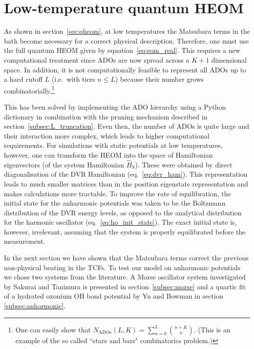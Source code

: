 \section{Low-temperature quantum HEOM}\label{sec:qheom_low_temp}
As shown in section~\ref{sec:qheom}, at low temperatures the Matsubara terms in the bath become necessary for a correct physical description. Therefore, one must use the full quantum HEOM given by equation~\ref{eq:eom_real}. This requires a new computational treatment since ADOs are now spread across a $K+1$ dimensional space. In addition, it is not computationally feasible to represent all ADOs up to a hard cutoff $L$ (i.e.~with tiers $n\le L$) because their number grows combinatorially.\footnote[2]{One can easily show that $N_\mathrm{ADOs}(L,K) = \sum_{n=0}^{L}\binom{n+K}{n}$. (This is an example of the so called ``stars and bars" combinatorics problem.)}

This has been solved by implementing the ADO hierarchy using a Python dictionary in combination with the pruning mechanism described in section~\ref{subsec:L_truncation}. Even then, the number of ADOs is quite large and their interaction more complex, which leads to higher computational requirements. For simulations with static potentials at low temperatures, however, one can transform the HEOM into the space of Hamiltonian eigenvectors (of the system Hamiltonian $\hat{H}_\mathrm{S}$). These were obtained by direct diagonalisation of the DVR Hamiltonian (eq.~\ref{eq:dvr_ham}). This representation leads to much smaller matrices than in the position eigenstate representation and makes calculations more tractable. To improve the rate of equilibration, the initial state for the anharmonic potentials was taken to be the Boltzmann distribution of the DVR energy levels, as opposed to the analytical distribution for the harmonic oscillator (eq.~\ref{eq:ho_init_state}). The exact initial state is, however, irrelevant, assuming that the system is properly equilibrated before the measurement.

In the next section we have shown that the Matsubara terms correct the previous non-physical beating in the TCFs. To test our model on anharmonic potentials we chose two systems from the literature. A Morse oscillator system investigated by Sakurai and Tanimura\supercite{Sakurai2011} is presented in section~\ref{subsec:morse} and a quartic fit of a hydrated oxonium OH bond potential by Yu and Bowman\supercite{Yu2019} in section \ref{subsec:anharmonic}.

\newpage
